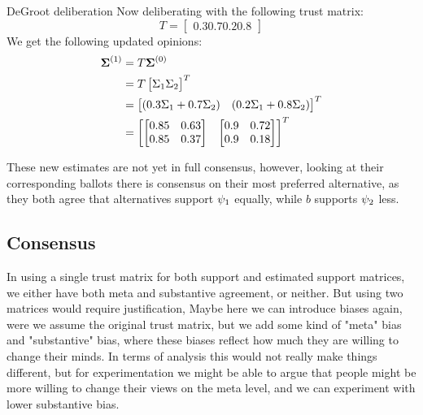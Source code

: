 \begin{example}{DeGroot deliberation} {}
						Now deliberating with the
						following trust matrix: \[
							T=\begin{bmatrix} 0.3
								0.7 0.2	0.8
								\end{bmatrix}
								\] We get the
						following updated opinions:
						\begin{align*}
							\boldsymbol{\boldsymbol{\Sigma}}^{(1)}
							& =
							T\boldsymbol{\boldsymbol{\Sigma}}^{(0)}
							\\ &
							=T\begin{bmatrix}\Sigma_1
								\Sigma_2\end{bmatrix}^{T}
							\\ &
							=\begin{bmatrix}(0.3\Sigma_1
							+ 0.7\Sigma_{2}) &
						(0.2\Sigma_1 +
					0.8\Sigma_{2})\end{bmatrix}^{T} \\
							   & = \begin{bmatrix}
								   \begin{bmatrix}
									   0.85
									   &
									   0.63
									   \\
									   0.85
									   &
									   0.37
									   \\
									   \end{bmatrix}
									   &
								   \begin{bmatrix}
								   0.9 & 0.72
							   \\ 0.9 & 0.18 \\
						   \end{bmatrix}
							   \end{bmatrix}^{T}
						\end{align*}

						These new estimates are not yet
						in full consensus, however,
						looking at their corresponding
						ballots there is consensus on
						their most preferred
						alternative, as they both agree
						that alternatives support
						$\psi_1$ equally, while $b$
						supports $\psi_2$ less.

					\label{example:deGroot-delib}
					\end{example}

					\subsection{Consensus} \label{sub:
					concensus DeGroot}
					\textcolor{RedViolet}{In using a single
					trust matrix for both support and
				estimated support matrices, we either have both
			meta and substantive agreement, or neither. But using
		two matrices would require justification, Maybe here we can
	introduce biases again, were we assume the original trust matrix, but
we add some kind of "meta" bias and "substantive" bias, where these biases
reflect how much they are willing to change their minds. In terms of analysis
this would not really make things different, but for experimentation we might
be able to argue that people might be more willing to change their views on the
meta level, and we can experiment with lower substantive bias.}

